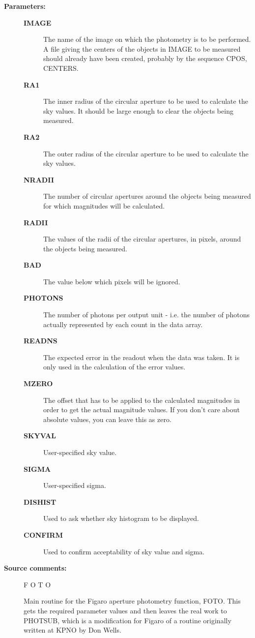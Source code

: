 \begin{description}
\begin{description}
\item [\textbf{Parameters:}]
\begin{description}
\item [\textbf{IMAGE}]
 The name of the image on which the photometry is to be
 performed.  A file giving the centers of the objects in
 IMAGE to be measured should already have been created,
 probably by the sequence CPOS, CENTERS.
\item [\textbf{RA1}]
 The inner radius of the circular aperture to be used to
 calculate the sky values.  It should be large enough to
 clear the objects being measured.
\item [\textbf{RA2}]
 The outer radius of the circular aperture to be used to
 calculate the sky values.
\item [\textbf{NRADII}]
 The number of circular apertures around the objects being
 measured for which magnitudes will be calculated.
\item [\textbf{RADII}]
 The values of the radii of the circular apertures, in
 pixels, around the objects being measured.
\item [\textbf{BAD}]
 The value below which pixels will be ignored.
\item [\textbf{PHOTONS}]
 The number of photons per output unit - i.e. the number of
 photons actually represented by each count in the data array.
\item [\textbf{READNS}]
 The expected error in the readout when the data was taken.
 It is only used in the calculation of the error values.
\item [\textbf{MZERO}]
 The offset that has to be applied to the calculated
 magnitudes in order to get the actual magnitude values.
 If you don't care about absolute values, you can leave
 this as zero.
\item [\textbf{SKYVAL}]
 User-specified sky value.
\item [\textbf{SIGMA}]
 User-specified sigma.
\item [\textbf{DISHIST}]
 Used to ask whether sky histogram to be displayed.
\item [\textbf{CONFIRM}]
 Used to confirm acceptability of sky value and sigma.
\end{description}

\item [\textbf{Source comments:}]
\begin{terminalv}
 F O T O

 Main routine for the Figaro aperture photometry function, FOTO.
 This gets the required parameter values and then leaves the real
 work to PHOTSUB, which is a modification for Figaro of a routine
 originally written at KPNO by Don Wells.


\end{terminalv}
\end{description}
\end{description}

